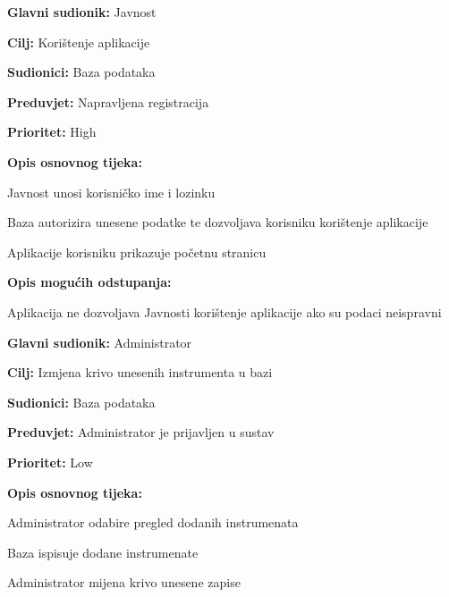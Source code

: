 \noindent {}
	\begin{packed_item}
	
		\item \textbf{Glavni sudionik: } Javnost
		\item  \textbf{Cilj:} Korištenje aplikacije
		\item  \textbf{Sudionici:} Baza podataka
		\item  \textbf{Preduvjet:} Napravljena registracija
		\item  \textbf{Prioritet:} High
		\item  \textbf{Opis osnovnog tijeka:}
		
		\item[] \begin{packed_enum}

			\item Javnost unosi korisničko ime i lozinku
			\item Baza autorizira unesene podatke te dozvoljava korisniku korištenje aplikacije
			\item Aplikacije korisniku prikazuje početnu stranicu
		\end{packed_enum}
	
			\item  \textbf{Opis mogućih odstupanja:}
			\item[] \begin{packed_enum}
												
				\item[2.a] Aplikacija ne dozvoljava Javnosti korištenje aplikacije ako su podaci neispravni
				
			\end{packed_enum}
	\end{packed_item}


\noindent {}
	\begin{packed_item}

		\item \textbf{Glavni sudionik: }Administrator
		\item \textbf{Cilj:} Izmjena krivo unesenih instrumenta u bazi
		\item \textbf{Sudionici:} Baza podataka
		\item \textbf{Preduvjet:} Administrator je prijavljen u sustav
		\item \textbf{Prioritet:} Low
		\item \textbf{Opis osnovnog tijeka:}
		
		\item[] \begin{packed_enum}

			\item Administrator odabire pregled dodanih instrumenata
			\item Baza ispisuje dodane instrumenate
			\item Administrator mijena krivo unesene zapise 
		\end{packed_enum}
	\end{packed_item}
			
